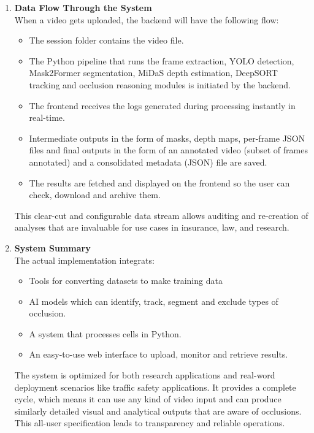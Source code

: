 \documentclass[12pt,a4paper]{report}
\theoremstyle{definition}
\theoremstyle{remark}
\begin{document}
\begin{enumerate}
    \item \textbf{Data Flow Through the System}\\
    When a video gets uploaded, the backend will have the following flow:
    \begin{itemize}
        \item The session folder contains the video file.
        \item The Python pipeline that runs the frame extraction, YOLO detection, Mask2Former segmentation, MiDaS depth estimation, DeepSORT tracking and occlusion reasoning modules is initiated by the backend.
        \item The frontend receives the logs generated during processing instantly in real-time.
        \item Intermediate outputs in the form of masks, depth maps, per-frame JSON files and final outputs in the form of an annotated video (subset of frames annotated) and a consolidated metadata (JSON) file are saved.
        \item The results are fetched and displayed on the frontend so the user can check, download and archive them.
    \end{itemize}
    This clear-cut and configurable data stream allows auditing and re-creation of analyses that are invaluable for use cases in insurance, law, and research.

    \item \textbf{System Summary}\\
    The actual implementation integrats:
    \begin{itemize}
        \item Tools for converting datasets to make training data
        \item AI models which can identify, track, segment and exclude types of occlusion.
        \item A system that processes cells in Python.
        \item An easy-to-use web interface to upload, monitor and retrieve results.
    \end{itemize}
    The system is optimized for both research applications and real-word deployment scenarios like traffic safety applications. It provides a complete cycle, which means it can use any kind of video input and can produce similarly detailed visual and analytical outputs that are aware of occlusions. This all-user specification leads to transparency and reliable operations. 

\end{enumerate}
\end{document}
